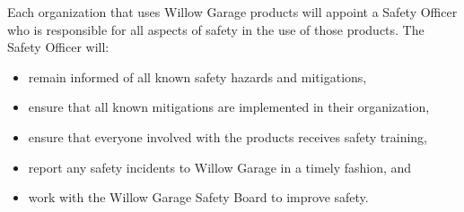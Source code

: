 Each organization that uses Willow Garage products will appoint a Safety Officer who is responsible for all aspects of safety in the use of those products. The Safety Officer will:
\begin{itemize}
\item remain informed of all known safety hazards and mitigations,
\item ensure that all known mitigations are implemented in their organization,
\item ensure that everyone involved with the products receives safety training,
\item report any safety incidents to Willow Garage in a timely fashion, and
\item work with the Willow Garage Safety Board to improve safety.
\end{itemize}
